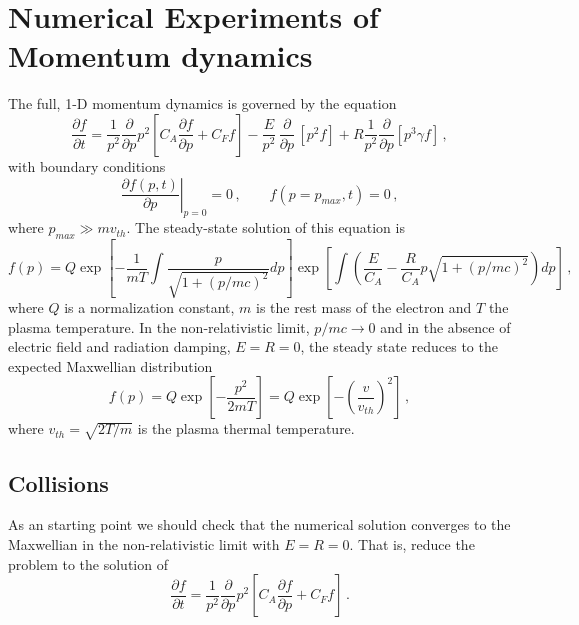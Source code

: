 \documentclass[preprint,11pt]{elsarticle}
\newcommand{\bq}{\begin{equation}}
\newcommand{\eq}{\end{equation}}
\begin{document}
\section{Numerical Experiments of Momentum dynamics}\label{Sect:Mom}

The full, 1-D momentum dynamics is governed by the equation
\bq
\frac{\partial f}{\partial t}=\frac{1}{p^2} \frac{\partial}{\partial p} p^2 \left[ C_A \frac{\partial f}{\partial p} + C_F f\right]
 - \frac{E}{p^2} \, \frac{\partial}{\partial p}\, \left[ p^2 f\right] +
R \frac{1}{p^2} \frac{\partial}{\partial p}\left[ p^3 \gamma f \right] \, ,
\eq
with boundary conditions
\bq
\left. \frac{\partial f (p,t)}{\partial p}\right|_{p=0}=0 \, , \qquad f(p=p_{max},t)=0 \, ,
\eq
where $p_{max} \gg m v_{th}$. 
The steady-state solution of this equation is
\bq
f(p)=Q \exp \left[-\frac{1}{m T} \int \frac{p}{\sqrt{1+(p/mc)^2}} dp \right]
\exp \left[\int \left( \frac{E}{C_A} -\frac{R}{C_A} p  \sqrt{1+(p/mc)^2} \right) dp \right] \, ,
\eq
where $Q$ is a normalization constant, $m$ is the rest mass of the electron and $T$ the plasma temperature. 
In the non-relativistic limit, $p/mc\rightarrow 0$ and in the absence of electric field and radiation damping, $E=R=0$, the steady state reduces to the expected Maxwellian distribution 
\bq
\label{eq_maxwell}
f(p)=Q \exp \left[-\frac{p^2}{2m T} \right]= Q \exp \left[-\left(\frac{v}{v_{th}}\right)^2 \right] \, ,
\eq
where $v_{th}=\sqrt{2 T/m}$ is the plasma thermal temperature. 
\subsection{Collisions}\label{SubSect:mom-collisions}
As an starting point we should check that the numerical solution converges to the Maxwellian in the non-relativistic limit with $E=R=0$. That is, reduce the problem to the solution of
\bq
\frac{\partial f}{\partial t}=\frac{1}{p^2} \frac{\partial}{\partial p} p^2 \left[ C_A \frac{\partial f}{\partial p} + C_F f\right] \, .
\eq
\end{document}
